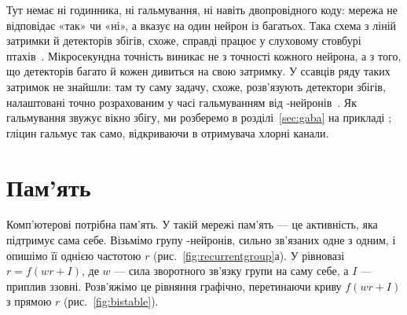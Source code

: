 Тут немає ні годинника, ні гальмування, ні навіть двопровідного коду: мережа не відповідає «так» чи «ні», а вказує на один нейрон із багатьох. Така схема з ліній затримки й детекторів збігів, схоже, справді працює у слуховому стовбурі птахів~\cite{Carr1990}. Мікросекундна точність виникає не з точності кожного нейрона, а з того, що детекторів багато й кожен дивиться на свою затримку. У ссавців ряду таких затримок не знайшли: там ту саму задачу, схоже, розв'язують детектори збігів, налаштовані точно розрахованим у часі гальмуванням від -нейронів~\cite{Brand2002,Grothe2010}. Як гальмування звужує вікно збігу, ми розберемо в розділі~\ref{sec:gaba} на прикладі ; гліцин гальмує так само, відкриваючи в отримувача хлорні канали.

\section{Пам'ять}

Комп'ютерові потрібна пам'ять. У такій мережі пам'ять --- це активність, яка підтримує сама себе. Візьмімо групу -нейронів, сильно зв'язаних одне з одним, і опишімо її однією частотою $r$ (рис.~\ref{fig:recurrentgroup}а). У рівновазі $r=f(wr+I)$, де $w$ --- сила зворотного зв'язку групи на саму себе, а $I$ --- приплив ззовні. Розв'яжімо це рівняння графічно, перетинаючи криву $f(wr+I)$ з прямою $r$ (рис.~\ref{fig:bistable}).

